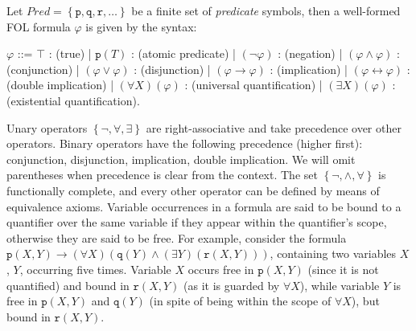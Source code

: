 Let $\textit{Pred} = \left\{\texttt{p}, \texttt{q}, \texttt{r}, \dots\right\}$ be a finite set of \textit{predicate} symbols, then a well-formed FOL formula $\varphi$ is given by the syntax:
\begin{center}
	\begin{bnf}
		$\varphi$ ::= $\top$ : (true)
		| $\texttt{p}(T)$ : (atomic predicate)
		| $(\neg \varphi)$ : (negation)
		| $(\varphi \wedge \varphi)$ : (conjunction)
		| $(\varphi \vee \varphi)$ : (disjunction)
		| $(\varphi \rightarrow \varphi)$ : (implication)
		| $(\varphi \leftrightarrow \varphi)$ : (double implication)
		| $(\forall X)(\varphi)$ : (universal quantification)
		| $(\exists X)(\varphi)$ : (existential quantification).
	\end{bnf}
\end{center}
Unary operators $\left\{\neg, \forall, \exists\right\}$ are right-associative and take precedence over other operators. Binary operators have the following precedence (higher first): conjunction, disjunction, implication, double implication. We will omit parentheses when precedence is clear from the context. The set $\left\{\neg, \wedge, \forall\right\}$ is functionally complete, and every other operator can be defined by means of equivalence axioms.
Variable occurrences in a formula are said to be bound to a quantifier over the same variable if they appear within the quantifier's scope, otherwise they are said to be free.
For example, consider the formula $\texttt{p}(X, Y) \rightarrow (\forall X)(\texttt{q}(Y) \wedge (\exists Y)(\texttt{r}(X,Y)))$, containing two variables $X$, $Y$, occurring five times. Variable $X$ occurs free in $\texttt{p}(X, Y)$ (since it is not quantified) and bound in $\texttt{r}(X, Y)$ (as it is guarded by $\forall X$), while variable $Y$ is free in $\texttt{p}(X, Y)$ and $\texttt{q}(Y)$ (in spite of being within the scope of $\forall X$), but bound in $\texttt{r}(X, Y)$.

